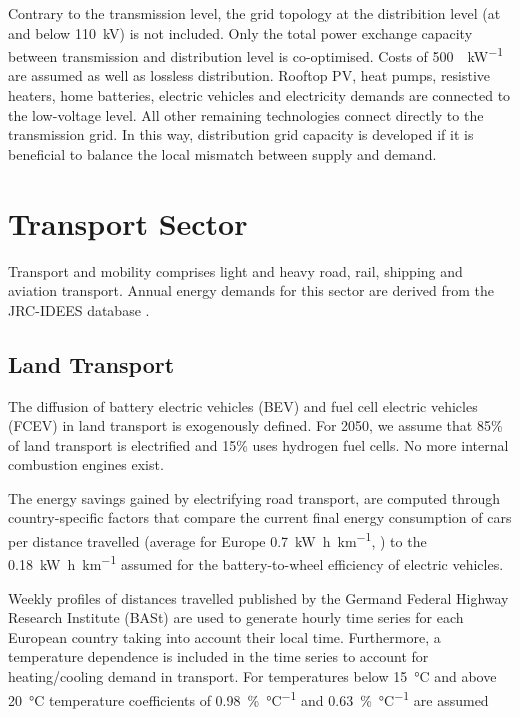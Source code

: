 
Contrary to the transmission level, the grid topology at the distribition level
(at and below \SI{110}{\kilo\volt}) is not included. Only the total power
exchange capacity between transmission and distribution level is co-optimised.
Costs of \SI{500}{\sieuro\per\kilo\watt} are assumed as well as lossless
distribution. Rooftop PV, heat pumps, resistive heaters, home batteries,
electric vehicles and electricity demands are connected to the low-voltage
level. All other remaining technologies connect directly to the transmission
grid. In this way, distribution grid capacity is developed if it is beneficial
to balance the local mismatch between supply and demand.

\section{Transport Sector}
\label{sec:si:transport}

Transport and mobility comprises light and heavy road, rail, shipping and
aviation transport. Annual energy demands for this sector are derived from the
JRC-IDEES database .

\subsection{Land Transport}
\label{sec:si:transport:land}

The diffusion of battery electric vehicles (BEV) and fuel cell electric vehicles
(FCEV) in land transport is exogenously defined. For 2050, we assume that 85\%
of land transport is electrified and 15\% uses hydrogen fuel cells. No more
internal combustion engines exist.

The energy savings gained by electrifying road transport, are computed through
country-specific factors that compare the current final energy consumption of
cars per distance travelled (average for Europe
\SI{0.7}{\kilo\watt\hour\per\kilo\metre}, \citeS{}) to the
\SI{0.18}{\kilo\watt\hour\per\kilo\metre} assumed for the battery-to-wheel
efficiency of electric vehicles.

Weekly profiles of distances travelled published by the Germand Federal Highway
Research Institute (BASt) \citeS{} are used to generate hourly time series for
each European country taking into account their local time. Furthermore, a
temperature dependence is included in the time series to account for
heating/cooling demand in transport. For temperatures below \SI{15}{\celsius}
and above \SI{20}{\celsius} temperature coefficients of
\SI{0.98}{\percent\per\celsius} and \SI{0.63}{\percent\per\celsius} are assumed


